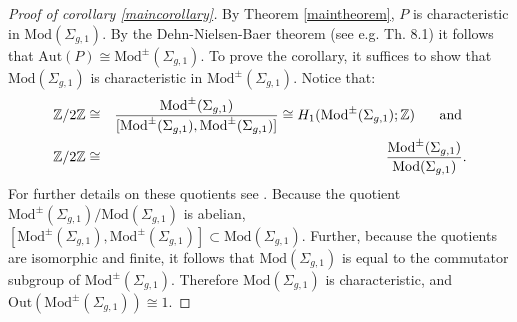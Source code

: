 \documentclass[a4paper]{amsproc}
\theoremstyle{TheoremNum}
\theoremstyle{Theorembold}
\theoremstyle{TheoremboldDef}
\theoremstyle{TheoremboldRem}
\theoremstyle{TheoremboldRem}
\begin{document}
\begin{proof}[Proof of corollary \ref{maincorollary}] By Theorem \ref{maintheorem}, $P$ is characteristic in ${\text{Mod}(\Sigma_{g,1})}$. By the Dehn-Nielsen-Baer theorem (see e.g. \cite{primer} Th. 8.1) it follows that $\text{Aut}(P)\cong{\text{Mod}^\pm(\Sigma_{g,1})}$. To prove the corollary, it suffices to show that ${\text{Mod}(\Sigma_{g,1})}$ is characteristic in ${\text{Mod}^\pm(\Sigma_{g,1})}$. Notice that: \begin{eqnarray*}{\mathbb{Z}}/2{\mathbb{Z}}&\cong & \frac{\text{Mod}^\pm(\Sigma_{g,1})}{[{\text{Mod}^\pm(\Sigma_{g,1})},{\text{Mod}^\pm(\Sigma_{g,1})}]}\cong H_1({\text{Mod}^\pm(\Sigma_{g,1})};{\mathbb{Z}})\hspace{.5cm}\text{ and } \\ {\mathbb{Z}}/2{\mathbb{Z}}& \cong & \frac{\text{Mod}^\pm(\Sigma_{g,1})}{\text{Mod}(\Sigma_{g,1})}.\end{eqnarray*} For further details on these quotients see \cite[Th. 5.2 and Ch. 8]{primer}. Because the quotient ${\text{Mod}^\pm(\Sigma_{g,1})}/{\text{Mod}(\Sigma_{g,1})}$ is abelian, $[{\text{Mod}^\pm(\Sigma_{g,1})},{\text{Mod}^\pm(\Sigma_{g,1})}]\subset{\text{Mod}(\Sigma_{g,1})}$. Further, because the quotients are isomorphic and finite, it follows that ${\text{Mod}(\Sigma_{g,1})}$ is equal to the commutator subgroup of ${\text{Mod}^\pm(\Sigma_{g,1})}$. Therefore ${\text{Mod}(\Sigma_{g,1})}$ is characteristic, and $\text{Out}({\text{Mod}^\pm(\Sigma_{g,1})})\cong 1$.
\end{proof}
\end{document}
